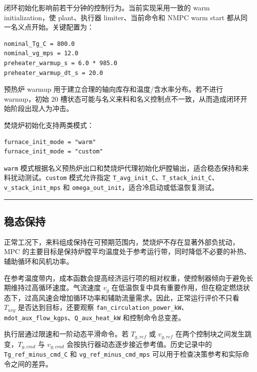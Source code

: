 \documentclass[UTF8,openany,zihao=-4,oneside]{ctexbook}
\providecommand{\passthrough}[1]{#1}
\newcommand{\manualdivider}{\par\vspace{0.6em}\noindent\textcolor{FGLine}{\rule{\linewidth}{0.7pt}}\vspace{0.6em}\par}
\begin{document}
闭环初始化影响前若干分钟的控制行为。当前实现采用一致的 warm initialization，使 plant、执行器 limiter、当前命令和 NMPC warm start 都从同一名义点开始。关键配置为：

\begin{lstlisting}
nominal_Tg_C = 800.0
nominal_vg_mps = 12.0
preheater_warmup_s = 6.0 * 985.0
preheater_warmup_dt_s = 20.0
\end{lstlisting}

预热炉 warmup 用于建立合理的轴向库存和温度/含水率分布。若不进行 warmup，初始 20 槽状态可能与名义来料和名义控制点不一致，从而造成闭环开始阶段出现人为冲击。

焚烧炉初始化支持两类模式：

\begin{lstlisting}
furnace_init_mode = "warm"
furnace_init_mode = "custom"
\end{lstlisting}

\passthrough{\lstinline!warm!} 模式根据名义预热炉出口和焚烧炉代理初始化炉膛输出，适合稳态保持和来料扰动测试。\passthrough{\lstinline!custom!} 模式允许指定 \passthrough{\lstinline!T_avg_init_C!}、\passthrough{\lstinline!T_stack_init_C!}、\passthrough{\lstinline!v_stack_init_mps!} 和 \passthrough{\lstinline!omega_out_init!}，适合冷启动或低温恢复测试。

\manualdivider

\subsection{稳态保持}\label{subsec:normal-operation-policy}

正常工况下，来料组成保持在可预期范围内，焚烧炉不存在显著外部负扰动，MPC 的主要目标是保持炉膛平均温度处于参考运行带，同时降低不必要的补热、辅助循环和风机功率。

在参考温度带内，成本函数会提高经济运行项的相对权重，使控制器倾向于避免长期维持过高循环速度。气流速度 \(v_g\) 在低温恢复中具有重要作用，但在稳定燃烧状态下，过高风速会增加循环功率和辅助流量需求。因此，正常运行评价不只看 \(T_{avg}\) 是否达到目标，还要观察 \passthrough{\lstinline!fan_circulation_power_kW!}、\passthrough{\lstinline!mdot_aux_flow_kgps!}、\passthrough{\lstinline!Q_aux_heat_kW!} 和控制命令总变差。

执行层通过限速和一阶动态平滑命令。若 \(T_{g,ref}\) 或 \(v_{g,ref}\) 在两个控制块之间发生跳变，\(T_{g,cmd}\) 与 \(v_{g,cmd}\) 会按执行器动态逐步接近参考值。历史记录中的 \passthrough{\lstinline!Tg_ref_minus_cmd_C!} 和 \passthrough{\lstinline!vg_ref_minus_cmd_mps!} 可以用于检查决策参考和实际命令之间的差异。
\end{document}
